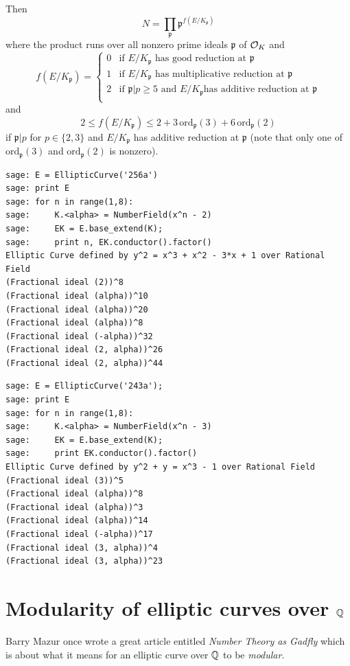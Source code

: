 \documentclass{book}
\begin{document}
Then
$$
N = \prod_{\mathfrak{p}} \mathfrak{p}^{f(E/K_{\mathfrak{p}})}
$$
where the product runs over all nonzero prime ideals $\mathfrak{p}$
of $\mathcal{O}_K$ and
$$
f(E/K_\mathfrak{p}) = \left\{\begin{array}{ll}
0 & \text{if $E/K_{\mathfrak{p}}$ has good reduction at $\mathfrak{p}$} \\
1 & \text{if $E/K_{\mathfrak{p}}$ has multiplicative
reduction at $\mathfrak{p}$} \\
2 & \text{if $\mathfrak{p}|p \geq 5$ and $E/K_{\mathfrak{p}}$
has additive reduction at $\mathfrak{p}$} \\
\end{array}\right.
$$
and
$$
2 \leq f(E/K_{\mathfrak{p}}) \leq 2 + 3 \, \mathrm{ord}_{\mathfrak{p}}(3)
 + 6 \, \mathrm{ord}_{\mathfrak{p}}(2)
$$
if $\mathfrak{p}|p$ for $p \in \{2, 3\}$ and $E/K_{\mathfrak{p}}$ has
additive reduction at $\mathfrak{p}$ (note that only one of
$\mathrm{ord}_{\mathfrak{p}}(3)$ and $\mathrm{ord}_{\mathfrak{p}}(2)$ is
nonzero).

\begin{lstlisting}
sage: E = EllipticCurve('256a')
sage: print E
sage: for n in range(1,8):
sage:     K.<alpha> = NumberField(x^n - 2)
sage:     EK = E.base_extend(K);
sage:     print n, EK.conductor().factor()
Elliptic Curve defined by y^2 = x^3 + x^2 - 3*x + 1 over Rational Field
(Fractional ideal (2))^8
(Fractional ideal (alpha))^10
(Fractional ideal (alpha))^20
(Fractional ideal (alpha))^8
(Fractional ideal (-alpha))^32
(Fractional ideal (2, alpha))^26
(Fractional ideal (2, alpha))^44
\end{lstlisting}

\begin{lstlisting}
sage: E = EllipticCurve('243a');
sage: print E
sage: for n in range(1,8):
sage:     K.<alpha> = NumberField(x^n - 3)
sage:     EK = E.base_extend(K);
sage:     print EK.conductor().factor()
Elliptic Curve defined by y^2 + y = x^3 - 1 over Rational Field
(Fractional ideal (3))^5
(Fractional ideal (alpha))^8
(Fractional ideal (alpha))^3
(Fractional ideal (alpha))^14
(Fractional ideal (-alpha))^17
(Fractional ideal (3, alpha))^4
(Fractional ideal (3, alpha))^23
\end{lstlisting}

\section{Modularity of elliptic curves over $\mathbb{Q}$}
Barry Mazur once wrote a great article entitled {\em Number Theory as Gadfly}
which is about what it means for an elliptic curve
over $\mathbb{Q}$ to be {\em modular}.
\end{document}
